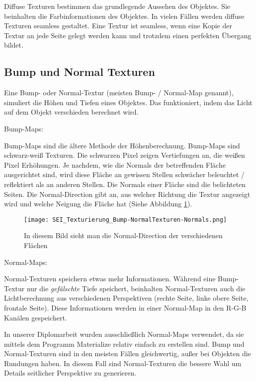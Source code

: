 Diffuse Texturen\citep{blender:tex_introduction} bestimmen das grundlegende Aussehen des Objektes. Sie beinhalten die Farbinformationen des
Objektes.
In vielen Fällen werden diffuse Texturen seamless gestaltet. Eine Textur ist seamless, wenn eine Kopie der Textur an
jede Seite gelegt werden kann und trotzdem einen perfekten Übergang bildet.

\subsection{Bump und Normal Texturen}
\label{sec:tex_normal}

Eine Bump- oder Normal-Textur (meisten Bump- / Normal-Map genannt), simuliert die Höhen und Tiefen eines Objektes.
Das funktioniert, indem das Licht auf dem Objekt verschieden berechnet wird.\citep{unity:normal_vs_bump}


Bump-Maps:

Bump-Maps sind die ältere Methode der Höhenberechnung. Bump-Maps sind schwarz-weiß Texturen. Die schwarzen Pixel
zeigen Vertiefungen an, die weißen Pixel Erhöhungen. Je nachdem, wie die Normals der betreffenden Fläche ausgerichtet
sind, wird diese Fläche an gewissen Stellen schwächer beleuchtet / reflektiert als an anderen Stellen. Die Normals
einer Fläche sind die belichteten Seiten. Die Normal-Direction gibt an, aus welcher Richtung die Textur angezeigt
wird und welche Neigung die Fläche hat (Siehe Abbildung \ref{picture:normals}).

\begin{figure}[H]
    \centering
    \texttt{[image: SEI\_Texturierung\_Bump-NormalTexturen-Normals.png]}
    \caption{In diesem Bild sieht man die Normal-Direction der verschiedenen Flächen}
    \label{picture:normals}
\end{figure}


Normal-Maps:

Normal-Texturen speichern etwas mehr Informationen. Während eine Bump-Textur nur die \textit{gefälschte} Tiefe
speichert, beinhalten Normal-Texturen auch die Lichtberechnung aus verschiedenen Perspektiven (rechte Seite,
linke obere Seite, frontale Seite). Diese Informationen werden in einer Normal-Map in den R-G-B Kanälen gespeichert.

In unserer Diplomarbeit wurden ausschließlich Normal-Maps verwendet, da sie mittels dem Programm
Materialize\citep{bbs:materialize} relativ einfach zu erstellen sind. Bump und Normal-Texturen sind in den meisten
Fällen gleichwertig, außer bei Objekten die Rundungen haben. In diesem Fall sind Normal-Texturen die bessere Wahl
um Details seitlicher Perspektive zu generieren.

